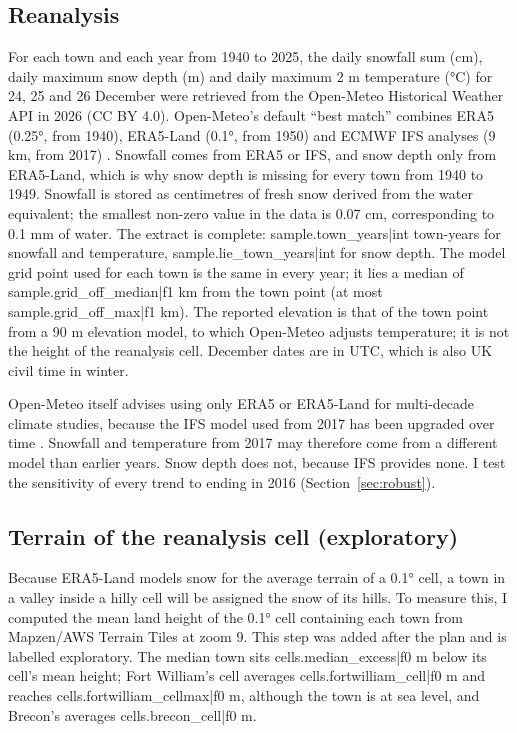 \documentclass[11pt,a4paper]{article}
\begin{document}
\subsection{Reanalysis}
For each town and each year from 1940 to 2025, the daily snowfall sum (cm), daily maximum snow depth (m) and daily maximum 2 m temperature (°C) for 24, 25 and 26 December were retrieved from the Open-Meteo Historical Weather API in 2026 (CC BY 4.0). Open-Meteo's default ``best match'' combines ERA5 (0.25°, from 1940), ERA5-Land (0.1°, from 1950) and ECMWF IFS analyses (9 km, from 2017) \citep{zippenfenig2023}. Snowfall comes from ERA5 or IFS, and snow depth only from ERA5-Land, which is why snow depth is missing for every town from 1940 to 1949. Snowfall is stored as centimetres of fresh snow derived from the water equivalent; the smallest non-zero value in the data is 0.07 cm, corresponding to 0.1 mm of water. The extract is complete: {{sample.town_years|int}} town-years for snowfall and temperature, {{sample.lie_town_years|int}} for snow depth. The model grid point used for each town is the same in every year; it lies a median of {{sample.grid_off_median|f1}} km from the town point (at most {{sample.grid_off_max|f1}} km). The reported elevation is that of the town point from a 90 m elevation model, to which Open-Meteo adjusts temperature; it is not the height of the reanalysis cell. December dates are in UTC, which is also UK civil time in winter.

Open-Meteo itself advises using only ERA5 or ERA5-Land for multi-decade climate studies, because the IFS model used from 2017 has been upgraded over time \citep{zippenfenig2023}. Snowfall and temperature from 2017 may therefore come from a different model than earlier years. Snow depth does not, because IFS provides none. I test the sensitivity of every trend to ending in 2016 (Section~\ref{sec:robust}).

\subsection{Terrain of the reanalysis cell (exploratory)}
Because ERA5-Land models snow for the average terrain of a 0.1° cell, a town in a valley inside a hilly cell will be assigned the snow of its hills. To measure this, I computed the mean land height of the 0.1° cell containing each town from Mapzen/AWS Terrain Tiles at zoom 9. This step was added after the plan and is labelled exploratory. The median town sits {{cells.median_excess|f0}} m below its cell's mean height; Fort William's cell averages {{cells.fortwilliam_cell|f0}} m and reaches {{cells.fortwilliam_cellmax|f0}} m, although the town is at sea level, and Brecon's averages {{cells.brecon_cell|f0}} m.
\end{document}
